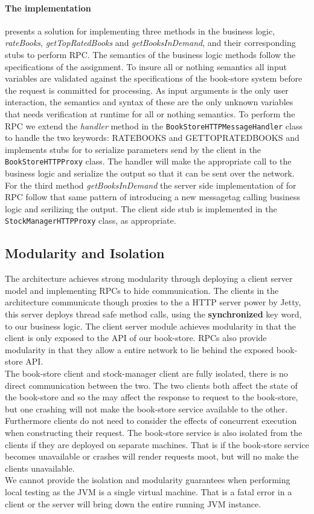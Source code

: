 \documentclass[a4paper]{article}
\begin{document}
\paragraph{The implementation} presents a solution for implementing three methods in the business logic, \textit{rateBooks}, \textit{getTopRatedBooks} and \textit{getBooksInDemand}, and their corresponding stubs to perform RPC. The semantics of the business logic methods follow the specifications of the assignment. To insure all or nothing semantics all input variables are validated against the specifications of the book-store system before the request is committed for processing. As input arguments is the only user interaction, the semantics and syntax of these are the only unknown variables that needs verification at runtime for all or nothing semantics. To perform the RPC we extend the \textit{handler} method in the \texttt{BookStoreHTTPMessageHandler} class to handle the two keywords: RATEBOOKS and GETTOPRATEDBOOKS and implements stubs for to serialize parameters send by the client in the \texttt{BookStoreHTTPProxy} class. The handler will make the appropriate call to the business logic and serialize the output so that it can be sent over the network. For the third method \textit{getBooksInDemand} the server side implementation of for RPC follow that same pattern of introducing a new messagetag calling business logic and serilizing the output. The client side stub is implemented in the \texttt{StockManagerHTTPProxy} class, as appropriate.
\subsection{Modularity and Isolation}
The architecture achieves strong modularity through deploying a client server model and implementing RPCs to hide communication. The clients in the architecture communicate though proxies to the a HTTP server power by Jetty, this server deploys thread safe method calls, using the \textbf{synchronized} key word, to our business logic. The client server module achieves modularity in that the client is only exposed to the API of our book-store. RPCs also provide modularity in that they allow a entire network to lie behind the exposed book-store API.\\
The book-store client and stock-manager client are fully isolated, there is no direct communication between the two. The two clients both affect the state of the book-store and so the may affect the response to request to the book-store, but one crashing will not make the book-store service available to the other. Furthermore clients do not need to consider the effects of concurrent execution when constructing their request. The book-store service is also isolated from the clients if they are deployed on separate machines. That is if the book-store service becomes unavailable or crashes will render requests moot, but will no make the clients unavailable.\\
We cannot provide the isolation and modularity guarantees when performing local testing as the JVM is a single virtual machine. That is a fatal error in a client or the server will bring down the entire running JVM instance.
\end{document}
